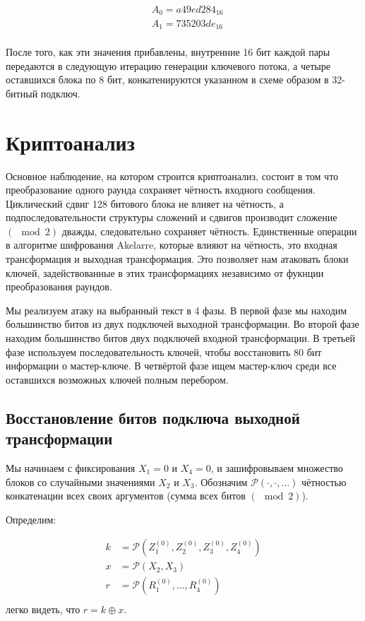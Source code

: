 \documentclass[12pt, a4paper]{article}
\begin{document}
\begin{equation}
\begin{split}
& A_0 = a49ed284_{16} \\
& A_1 = 735203de_{16} \\
\end{split}
\end{equation}

После того, как эти значения прибавлены, внутренние 16 бит каждой пары передаются в следующую итерацию генерации ключевого потока, а четыре оставшихся блока по 8 бит, конкатенируются указанном в схеме образом в 32-битный подключ.

\section{Криптоанализ \autocite{CRIAke}}

Основное наблюдение, на котором строится криптоанализ, состоит в том что преобразование одного раунда сохраняет чётность входного сообщения. 
Циклический сдвиг 128 битового блока не влияет на чётность, а подпоследовательности структуры сложений и сдвигов производит сложение $(\mod 2 )$ дважды, следовательно сохраняет чётность. Единственные операции в алгоритме шифрования Akelarre, которые влияют на чётность, это входная трансформация и выходная трансформация.
Это позволяет нам атаковать блоки ключей, задействованные в этих трансформациях независимо от фукнции преобразования раундов.

Мы реализуем атаку на выбранный текст в 4 фазы. В первой фазе мы находим большинство битов из двух подключей выходной трансформации. Во второй фазе находим большинство битов двух подключей входной трансформации. В третьей фазе используем последовательность ключей, чтобы восстановить 80 бит информации о мастер-ключе. В четвёртой фазе ищем мастер-ключ среди все оставшихся возможных ключей полным перебором.

\subsection{Восстановление битов подключа выходной трансформации}

Мы начинаем с фиксирования $X_1 = 0$ и $X_4 = 0$, и зашифровываем множество блоков со случайными значениями $X_2$ и $X_3$. Обозначим $\mathcal{P}(\cdot,\cdot, ...)$ чётностью конкатенации всех своих аргументов (сумма всех битов $(\mod 2)$).

Определим:

\begin{equation}
\begin{split}
k & = \mathcal{P}(Z_1^{(0)}, Z_2^{(0)}, Z_3^{(0)}, Z_4^{(0)}) \\
x & = \mathcal{P}(X_2, X_3) \\
r & = \mathcal{P}(R_1^{(0)}, ..., R_4^{(0)}) \\
\end{split}
\end{equation}
легко видеть, что $r = k \oplus x$.
\end{document}
